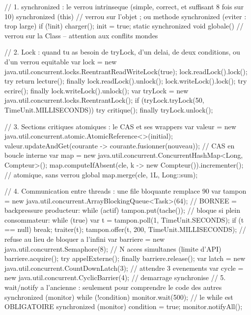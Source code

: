 \begin{codejava}
// 1. synchronized : le verrou intrinseque (simple, correct, et suffisant 8 fois sur 10)
synchronized (this) {                 // verrou sur l'objet ; ou methode synchronized (eviter : trop large)
    if (!init) { charger(); init = true; }
}
static synchronized void globale() { }      // verrou sur la Class -- attention aux conflits mondes

// 2. Lock : quand tu as besoin de tryLock, d'un delai, de deux conditions, ou d'un verrou equitable
var lock = new java.util.concurrent.locks.ReentrantReadWriteLock(true);
lock.readLock().lock(); try { return lecture(); } finally { lock.readLock().unlock(); }
lock.writeLock().lock(); try { ecrire(); } finally { lock.writeLock().unlock(); }
var tryLock = new java.util.concurrent.locks.ReentrantLock();
if (tryLock.tryLock(50, TimeUnit.MILLISECONDS)) { try { critique(); } finally { tryLock.unlock(); } }

// 3. Sections critiques atomiques : le CAS et ses wrappers
var valeur = new java.util.concurrent.atomic.AtomicReference<>(initial);
valeur.updateAndGet(courante -> courante.fusionner(nouveau));     // CAS en boucle interne
var map = new java.util.concurrent.ConcurrentHashMap<Long, Compteur>();
map.computeIfAbsent(cle, k -> new Compteur()).incrementer();      // atomique, sans verrou global
map.merge(cle, 1L, Long::sum);

// 4. Communication entre threads : une file bloquante remplace 90 %
var tampon = new java.util.concurrent.ArrayBlockingQueue<Task>(64);   // BORNEE = backpressure
producteur: while (actif) { tampon.put(tache()); }                  // bloque si plein
consommateur: while (true) { var t = tampon.poll(1, TimeUnit.SECONDS); if (t == null) break; traiter(t); }
tampon.offer(t, 200, TimeUnit.MILLISECONDS);                        // refuse au lieu de bloquer a l'infini
var barriere = new java.util.concurrent.Semaphore(8);               // N acces simultanes (limite d'API)
barriere.acquire(); try { appelExterne(); } finally { barriere.release(); }
var latch = new java.util.concurrent.CountDownLatch(3);            // attendre 3 evenements
var cycle = new java.util.concurrent.CyclicBarrier(4);              // demarrage synchronise
// 5. wait/notify a l'ancienne : seulement pour comprendre le code des autres
synchronized (monitor) { while (!condition) { monitor.wait(500); } }   // le while est OBLIGATOIRE
synchronized (monitor) { condition = true; monitor.notifyAll(); }
\end{codejava}

